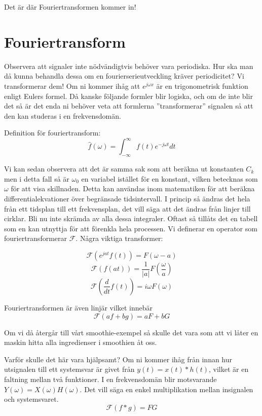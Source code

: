 \documentclass{article}
\begin{document}
Det är där Fouriertransformen kommer in!

\section{Fouriertransform}

Observera att signaler inte nödvändigtvis behöver vara periodiska. Hur ska man då kunna behandla dessa om en fourierserieutveckling kräver periodicitet? Vi transformerar dem! Om ni kommer ihåg att $e^{j\omega x}$ är en trigonometrisk funktion enligt Eulers formel. Då kanske följande formler blir logiska, och om de inte blir det så är det enda ni behöver veta att formlerna ''transformerar'' signalen så att den kan studeras i en frekvensdomän.

Definition för fouriertransform:
\[\hat{f}(\omega) = \int_{-\infty}^{\infty} f(t) e^{-j \omega t} dt\]

Vi kan sedan observera att det är samma sak som att beräkna ut konstanten $C_k$ men i detta fall så är $\omega_0$ en variabel istället för en konstant, vilken betecknas som $\omega$ för att visa skillnaden. 
Detta kan användas inom matematiken för att beräkna differentialekvationer över begränsade tidsintervall. I princip så ändras det hela från ett tidsplan till ett frekvensplan, det vill säga att det ändras från linjer till cirklar. %
Bli nu inte skrämda av alla dessa integraler. Oftast så tillåts det en tabell som en kan utnyttja för att förenkla hela processen. Vi definerar en operator som fouriertransformerar $\mathcal{F}$. Några viktiga transformer:

\[\mathcal{F}(e^{j a t} f(t)) = F(\omega - a)\]%
\[\mathcal{F}(f(at)) = \frac{1}{|a|}F(\frac{\omega}{a})\]%
\[\mathcal{F}(\frac{d}{dt} f(t)) = i\omega F(\omega) \]%

Fouriertransformen är även linjär vilket innebär
$$\mathcal{F}(a f + b g) = a F + b G$$

Om vi då återgår till vårt smoothie-exempel så skulle det vara som att vi låter en maskin hitta alla ingredienser i smoothien åt oss.

Varför skulle det här vara hjälpsamt? Om ni kommer ihåg från innan hur utsignalen till ett systemsvar är givet från $y(t) = x(t) * h(t)$, vilket är en faltning mellan två funktioner. I en frekvensdomän blir motsvarande $Y(\omega) = X(\omega) H(\omega)$. Det vill säga en enkel multiplikation mellan insignalen och systemsvaret.
\[\mathcal{F}(f*g) = F G \]
\end{document}

